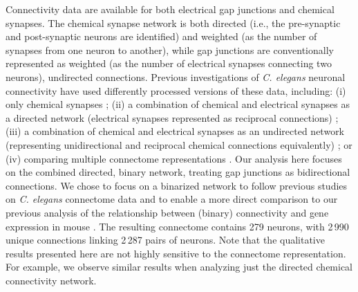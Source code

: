 \documentclass[10pt,letterpaper]{article}
\begin{document}
Connectivity data are available for both electrical gap junctions and chemical synapses.
The chemical synapse network is both directed (i.e., the pre-synaptic and post-synaptic neurons are identified) and weighted (as the number of synapses from one neuron to another), while gap junctions are conventionally represented as weighted (as the number of electrical synapses connecting two neurons), undirected connections.
Previous investigations of \emph{C. elegans} neuronal connectivity have used differently processed versions of these data, including:
(i) only chemical synapses \cite{Kashtan:2004ev};
(ii) a combination of chemical and electrical synapses as a directed network (electrical synapses represented as reciprocal connections) \cite{Azulay:2016cg, Kim:2016gl};
(iii) a combination of chemical and electrical synapses as an undirected network (representing unidirectional and reciprocal chemical connections equivalently) \cite{Towlson2013, Kim:2014bu, Pavlovic:2014gx, van2017guiding};
or (iv) comparing multiple connectome representations \cite{Pan:2010jt}.
Our analysis here focuses on the combined directed, binary network, treating gap junctions as bidirectional connections.
We chose to focus on a binarized network to follow previous studies on \textit{C. elegans} connectome data \citep{Kaufman2006, Towlson2013, Varier2011, Varadan2006, Pavlovic:2014gx} and to enable a more direct comparison to our previous analysis of the relationship between (binary) connectivity and gene expression in mouse \cite{Fulcher:2016ck}.
The resulting connectome contains 279 neurons, with 2\,990 unique connections linking 2\,287 pairs of neurons.
Note that the qualitative results presented here are not highly sensitive to the connectome representation.
For example, we observe similar results when analyzing just the directed chemical connectivity network.
\end{document}
